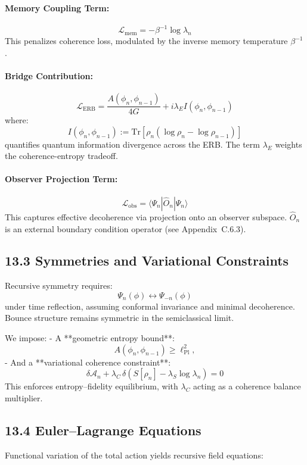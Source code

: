 \paragraph{Memory Coupling Term:}
\[
\mathcal{L}_{\text{mem}} = -\beta^{-1} \log \lambda_n
\]
This penalizes coherence loss, modulated by the inverse memory temperature \( \beta^{-1} \).

\paragraph{Bridge Contribution:}
\[
\mathcal{L}_{\text{ERB}} = \frac{A(\phi_n, \phi_{n-1})}{4G} + i\lambda_E I(\phi_n, \phi_{n-1})
\]
where:
\[
I(\phi_n, \phi_{n-1}) := \mathrm{Tr}[\rho_n (\log \rho_n - \log \rho_{n-1})]
\]
quantifies quantum information divergence across the ERB. The term \( \lambda_E \) weights the coherence-entropy tradeoff.

\paragraph{Observer Projection Term:}
\[
\mathcal{L}_{\text{obs}} = \langle \Psi_n | \hat{O}_n | \Psi_n \rangle
\]
This captures effective decoherence via projection onto an observer subspace. \( \hat{O}_n \) is an external boundary condition operator (see Appendix~C.6.3).

\subsection{13.3 Symmetries and Variational Constraints}

Recursive symmetry requires:
\[
\Psi_n(\phi) \leftrightarrow \Psi_{-n}(\phi)
\]
under time reflection, assuming conformal invariance and minimal decoherence. Bounce structure remains symmetric in the semiclassical limit.

We impose:
- A **geometric entropy bound**:
\[
A(\phi_n, \phi_{n-1}) \geq \ell_{\text{Pl}}^2,
\]
- And a **variational coherence constraint**:
\[
\delta \mathcal{A}_n + \lambda_C \, \delta\left( S[\rho_n] - \lambda_S \log \lambda_n \right) = 0
\]
This enforces entropy–fidelity equilibrium, with \( \lambda_C \) acting as a coherence balance multiplier.

\subsection{13.4 Euler–Lagrange Equations}

Functional variation of the total action yields recursive field equations:


